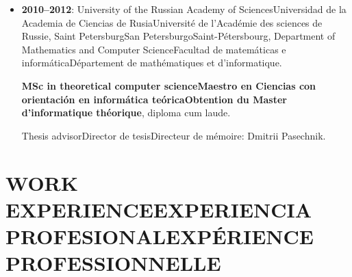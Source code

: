 \documentclass{article}
\newcommand{\biling}[3]{\ifdefined\english#1\fi\ifdefined\spanish#2\fi\ifdefined\french#3\fi}
\begin{document}
\begin{itemize}
  \biling{ALGANT Master Program}{Programa ALGANT Master}{Programme ALGANT Master}, \biling{European Union scholarship}{beca de la Unión Europea}{bourse de l'Union européenne}.

  \textbf{\biling{MSc in Mathematics}{Maestro en Ciencias con orientación en matemáticas}{Obtention du Master de mathématique}}.

  \biling{MSc thesis}{Tesis de maestría}{Mémoire}
  \biling{on algebraic K theory}{sobre la teoría K algebraica}{sur la K-théorie algébrique},
  \biling{supervised by}{dirigida por}{dirigé par} Boas Erez (\biling{Bordeaux}{Burdeos}{Bordeaux}).

\item \textbf{2010--2012}: \biling{University of the Russian Academy of Sciences}{Universidad de la Academia de Ciencias de Rusia}{Université de l'Académie des sciences de Russie},
  \biling{Saint Petersburg}{San Petersburgo}{Saint-Pétersbourg}, \biling{Department of Mathematics and Computer Science}{Facultad de matemáticas e informática}{Département de mathématiques et d'informatique}.

  \textbf{\biling{MSc in theoretical computer science}{Maestro en Ciencias con orientación en informática teórica}{Obtention du Master d'informatique théorique}},
  diploma cum laude.

  \biling{Thesis advisor}{Director de tesis}{Directeur de mémoire}: Dmitrii Pasechnik.

  \iffalse
\item \textbf{2006--2010}: \biling{Lipetsk State University}{Universidad Estatal de Lipetsk}, \biling{Russia}{Rusia}.

  \textbf{\biling{BSc in computer science and software engineering}{Licenciado en ciencias de computación y programación}},
  diploma cum laude.
  \fi

\end{itemize}

\pagebreak

{\color{RoyalBlue}\section*{\biling{WORK EXPERIENCE}{EXPERIENCIA PROFESIONAL}{EXPÉRIENCE PROFESSIONNELLE}}}
\end{document}
